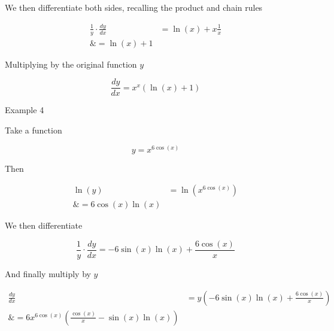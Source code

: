 We then differentiate both sides, recalling the product and chain rules    

                                                                      

 \begin{align}
\frac{1}{y}\cdot\frac{dy}{dx}&=\ln(x)+x\frac{1}{x} \\\&=\ln(x)+1
\end{align}



 Multiplying by the original function $y$                             

                                                                     

 $$\frac{dy}{dx}=x^x(\ln(x)+1)$$                                     





Example 4



 Take a function

                                                              

 $$y=x^{6\cos(x)}$$



Then                                              

                                                                     

 \begin{align}
\ln(y)&=\ln(x^{6\cos(x)}) \\\&=6\cos(x)\ln(x)
\end{align} 



We then differentiate

                                                

$$\frac{1}{y}\cdot\frac{dy}{dx}=-6\sin(x)\ln(x)+\frac{6\cos(x)}{x}$$



And finally multiply by $y$                                          

                                                                      

 \begin{align}                                                      

 \frac{dy}{dx}&=y\left(-6\sin(x)\ln(x)+\frac{6\cos(x)}{x}\right) \\\&=6x^{6\cos(x)}\left(\frac{\cos(x)}{x}-\sin(x)\ln(x)\right)
 \end{align}                                                        



